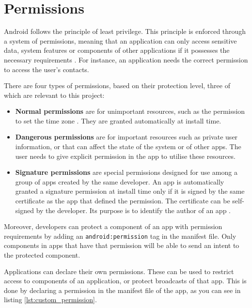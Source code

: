    \section{Permissions}
        \label{sec:permissions}
        
    Android follows the principle of least privilege. This principle is enforced through a system of permissions, meaning that an application can only access sensitive data, system features or components of other applications if it possesses the necessary requirements \cite{permissions_guide}. For instance, an application needs the correct permission to access the user’s contacts. 
    
    There are four types of permissions, based on their protection level, three of which are relevant to this project:
    \begin{itemize} [noitemsep]
        \item \textbf{Normal permissions} are for unimportant resources, such as the permission to set the time zone \cite{permissions_guide}. They are granted automatically at install time.
        \item \textbf{Dangerous permissions} are for important resources such as private user information, or that can affect the state of the system or of other apps. The user needs to give explicit permission in the app to utilise these resources.
        \item \textbf{Signature permissions} are special permissions designed for use among a group of apps created by the same developer. An app is automatically granted a signature permission at install time only if it is signed by the same certificate as the app that defined the permission. The certificate can be self-signed by the developer. Its purpose is to identify the author of an app \cite{define_custom_permission}.
    \end{itemize}
    
    Moreover, developers can protect a component of an app with permission requirements by adding an \lstinline|android:permission| tag in the manifest file. Only components in apps that have that permission will be able to send an intent to the protected component.
        
    Applications can declare their own permissions. These can be used to restrict access to components of an application, or protect broadcasts of that app. This is done by declaring a permission in the manifest file of the app, as you can see in listing \ref{lst:custom_permission}.
    

